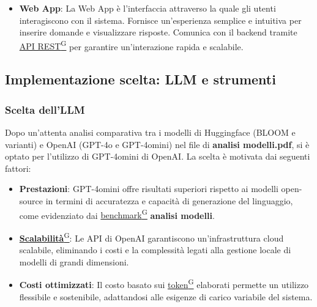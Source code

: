 \begin{itemize}
    \item \textbf{Web App}:  
    La Web App è l’interfaccia attraverso la quale gli utenti interagiscono con il sistema. Fornisce un’esperienza semplice e intuitiva per inserire domande e visualizzare risposte. Comunica con il backend tramite \href{https://code7crusaders.github.io/docs/RTB/documentazione_interna/glossario.html#api-rest-representational-state-transfer}{API REST\textsuperscript{G}} per garantire un'interazione rapida e scalabile.
\end{itemize}

\subsection{Implementazione scelta: LLM e strumenti}
\subsubsection{Scelta dell'LLM}
Dopo un'attenta analisi comparativa tra i modelli di Huggingface (BLOOM e varianti) e OpenAI (GPT-4o e GPT-4omini) nel file di \textbf{analisi modelli.pdf}, si è optato per l'utilizzo di GPT-4omini di OpenAI. La scelta è motivata dai seguenti fattori:
\begin{itemize}
    \item \textbf{Prestazioni}: GPT-4omini offre risultati superiori rispetto ai modelli open-source in termini di accuratezza e capacità di generazione del linguaggio, come evidenziato dai \href{https://code7crusaders.github.io/docs/RTB/documentazione_interna/glossario.html#benchmark}{benchmark\textsuperscript{G}} \textbf{analisi modelli}.
    \item \href{https://code7crusaders.github.io/docs/RTB/documentazione_interna/glossario.html#scalabilità}{\textbf{Scalabilità}\textsuperscript{G}}: Le API di OpenAI garantiscono un'infrastruttura cloud scalabile, eliminando i costi e la complessità legati alla gestione locale di modelli di grandi dimensioni.
    \item \textbf{Costi ottimizzati}: Il costo basato sui \href{https://code7crusaders.github.io/docs/RTB/documentazione_interna/glossario.html#token}{token\textsuperscript{G}} elaborati permette un utilizzo flessibile e sostenibile, adattandosi alle esigenze di carico variabile del sistema.
\end{itemize}

